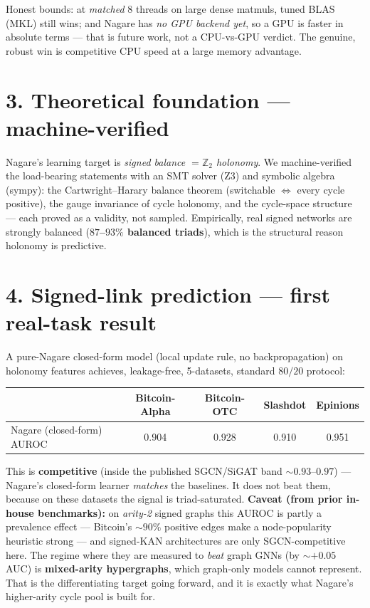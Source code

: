 \documentclass[11pt]{article}
\begin{document}
Honest bounds: at \emph{matched} 8 threads on large dense matmuls, tuned BLAS
(MKL) still wins; and Nagare has \emph{no GPU backend yet}, so a GPU is faster in
absolute terms --- that is future work, not a CPU-vs-GPU verdict. The genuine,
robust win is competitive CPU speed at a large memory advantage.

\section*{3. Theoretical foundation --- machine-verified}
Nagare's learning target is \emph{signed balance $=\mathbb{Z}_2$ holonomy}. We
machine-verified the load-bearing statements with an SMT solver (Z3) and symbolic
algebra (sympy): the Cartwright--Harary balance theorem (switchable $\iff$ every
cycle positive), the gauge invariance of cycle holonomy, and the cycle-space
structure --- each proved as a validity, not sampled. Empirically, real signed
networks are strongly balanced (\textbf{$87$--$93\%$ balanced triads}), which is
the structural reason holonomy is predictive.

\section*{4. Signed-link prediction --- first real-task result}
A pure-Nagare closed-form model (local update rule, no backpropagation) on
holonomy features achieves, leakage-free, 5-datasets, standard $80/20$ protocol:

\begin{center}\small
\begin{tabular}{lcccc}
\toprule
 & Bitcoin-Alpha & Bitcoin-OTC & Slashdot & Epinions \\
\midrule
Nagare (closed-form) AUROC & 0.904 & 0.928 & 0.910 & 0.951 \\
\bottomrule
\end{tabular}
\end{center}

This is \textbf{competitive} (inside the published SGCN/SiGAT band $\sim0.93$--$0.97$)
--- Nagare's closed-form learner \emph{matches} the baselines. It does not beat
them, because on these datasets the signal is triad-saturated. \textbf{Caveat (from
prior in-house benchmarks):} on \emph{arity-2} signed graphs this AUROC is partly a
prevalence effect --- Bitcoin's $\sim$$90\%$ positive edges make a node-popularity
heuristic strong --- and signed-KAN architectures are only SGCN-competitive here.
The regime where they are measured to \emph{beat} graph GNNs (by $\sim$$+0.05$ AUC)
is \textbf{mixed-arity hypergraphs}, which graph-only models cannot represent. That
is the differentiating target going forward, and it is exactly what Nagare's
higher-arity cycle pool is built for.
\end{document}
